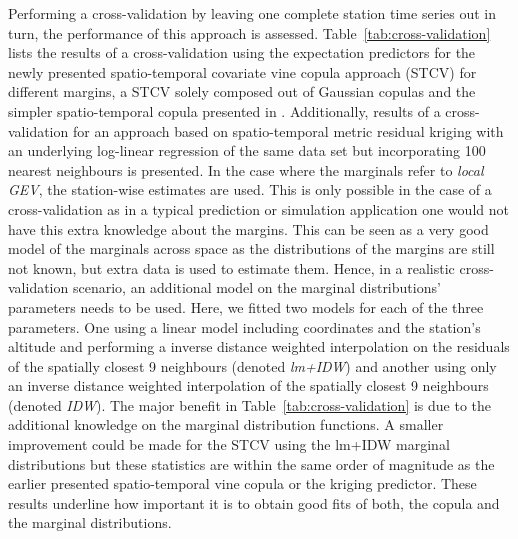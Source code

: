 \documentclass[article,nojss]{jss}
\begin{document}
Performing a cross-validation by leaving one complete station time series out in turn, the performance of this approach is assessed. Table~\ref{tab:cross-validation} lists the results of a cross-validation using the expectation predictors for the newly presented spatio-temporal covariate vine copula approach (STCV) for different margins, a STCV solely composed out of Gaussian copulas and the simpler spatio-temporal copula presented in \citet{Graler2012a}. Additionally, results of a cross-validation for an approach based on spatio-temporal metric residual kriging with an underlying log-linear regression of the same data set but incorporating 100 nearest neighbours \citep{Graler2012} is presented. In the case where the marginals refer to \emph{local GEV}, the station-wise estimates are used. This is only possible in the case of a cross-validation as in a typical prediction or simulation application one would not have this extra knowledge about the margins. This can be seen as a very good model of the marginals across space as the distributions of the margins are still not known, but extra data is used to estimate them. Hence, in a realistic cross-validation scenario, an additional model on the marginal distributions' parameters needs to be used. Here, we fitted two models for each of the three parameters. One using a linear model including coordinates and the station's altitude and performing a inverse distance weighted interpolation on the residuals of the spatially closest 9 neighbours (denoted \emph{lm+IDW}) and another using only an inverse distance weighted interpolation of the spatially closest 9 neighbours (denoted \emph{IDW}). The major benefit in Table~\ref{tab:cross-validation} is due to the additional knowledge on the marginal distribution functions. A smaller improvement could be made for the STCV using the lm+IDW marginal distributions but these statistics are within the same order of magnitude as the earlier presented spatio-temporal vine copula or the kriging predictor. These results underline how important it is to obtain good fits of both, the copula and the marginal distributions. 
\end{document}

